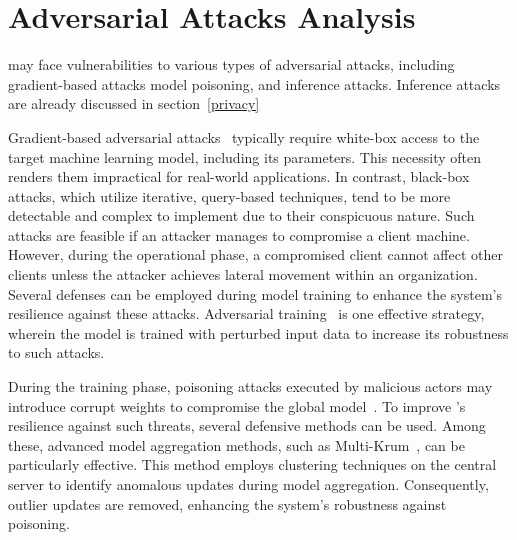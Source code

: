 \section{Adversarial Attacks Analysis}
\label{sec:adversarial}

\Sys may face vulnerabilities to various types of adversarial attacks, including gradient-based attacks model poisoning, and inference attacks. Inference attacks are already discussed in section~\ref{privacy}

Gradient-based adversarial attacks~\cite{chakraborty2021survey} typically require white-box access to the target machine learning model, including its parameters. This necessity often renders them impractical for real-world applications. In contrast, black-box attacks, which utilize iterative, query-based techniques, tend to be more detectable and complex to implement due to their conspicuous nature. Such attacks are feasible if an attacker manages to compromise a client machine. However, during the operational phase, a compromised client cannot affect other clients unless the attacker achieves lateral movement within an organization. Several defenses can be employed during model training to enhance the system's resilience against these attacks. Adversarial training~\cite{tramer2019adversarial} is one effective strategy, wherein the model is trained with perturbed input data to increase its robustness to such attacks.

During the training phase, poisoning attacks executed by malicious actors may introduce corrupt weights to compromise the global model~\cite{jagielski2018manipulating}. To improve \Sys's resilience against such threats, several defensive methods can be used. Among these, advanced model aggregation methods, such as Multi-Krum~\cite{munoz2019byzantine}, can be particularly effective. This method employs clustering techniques on the central server to identify anomalous updates during model aggregation. Consequently, outlier updates are removed, enhancing the system's robustness against poisoning.
